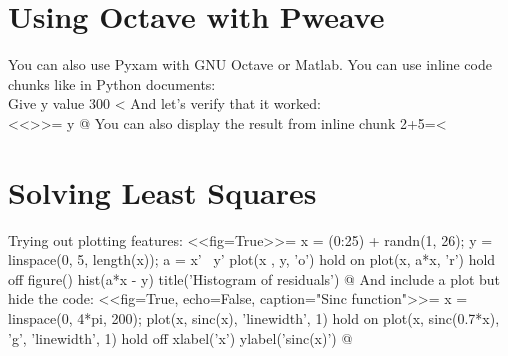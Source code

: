 \documentclass[12pt]{exam}
\begin{document}
        \section{Using Octave with Pweave}
            You can also use Pyxam with GNU Octave or Matlab. You can use inline code chunks like in Python documents: \\
            Give y value 300 <%
            And let's verify that it worked: \\
<<>>=
y
@
            You can also display the result from inline chunk 2+5=<%
        \section{Solving Least Squares}
            Trying out plotting features:
<<fig=True>>=
x = (0:25) + randn(1, 26);
y = linspace(0, 5, length(x));
a = x' \ y'
plot(x , y, 'o')
hold on
plot(x, a*x, 'r')
hold off
figure()
hist(a*x - y)
title('Histogram of residuals')
@
            And include a plot but hide the code:
<<fig=True, echo=False, caption="Sinc function">>=
x = linspace(0, 4*pi, 200);
plot(x, sinc(x), 'linewidth', 1)
hold on
plot(x, sinc(0.7*x), 'g', 'linewidth', 1)
hold off
xlabel('x')
ylabel('sinc(x)')
@
\end{document}
